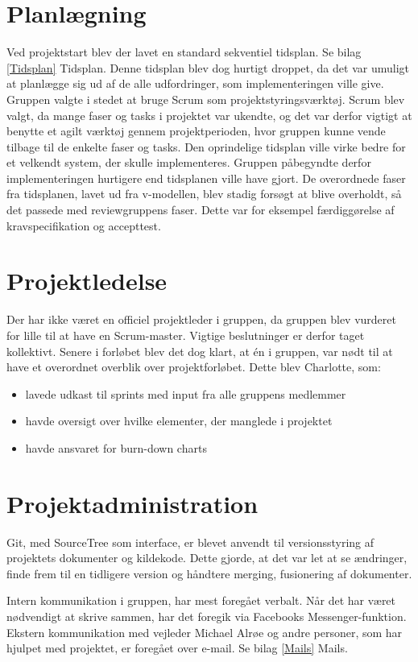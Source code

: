 \section{Planlægning}
Ved projektstart blev der lavet en standard sekventiel tidsplan. Se bilag \ref{Tidsplan} Tidsplan. Denne tidsplan blev dog hurtigt droppet, da det var umuligt at planlægge sig ud af de alle udfordringer, som implementeringen ville give. Gruppen valgte i stedet at bruge Scrum som projektstyringsværktøj. Scrum blev valgt, da mange faser og tasks i projektet var ukendte, og det var derfor vigtigt at benytte et agilt værktøj gennem projektperioden, hvor gruppen kunne vende tilbage til de enkelte faser og tasks. Den oprindelige tidsplan ville virke bedre for et velkendt system, der skulle implementeres. Gruppen påbegyndte derfor implementeringen hurtigere end tidsplanen ville have gjort. De overordnede faser fra tidsplanen, lavet ud fra v-modellen, blev stadig forsøgt at blive overholdt, så det passede med reviewgruppens faser. Dette var for eksempel færdiggørelse af kravspecifikation og accepttest. 

\section{Projektledelse}
Der har ikke været en officiel projektleder i gruppen, da gruppen blev vurderet for lille til at have en Scrum-master. Vigtige beslutninger er derfor taget kollektivt. Senere i forløbet blev det dog klart, at én i gruppen, var nødt til at have et overordnet overblik over projektforløbet. Dette blev Charlotte, som: 
\begin{itemize}
\item lavede udkast til sprints  med input fra alle gruppens medlemmer
\item havde oversigt over hvilke elementer, der manglede i projektet
\item havde ansvaret for burn-down charts
\end{itemize} 

\section{Projektadministration}
Git, med SourceTree som interface, er blevet anvendt til versionsstyring af projektets dokumenter og kildekode. Dette gjorde, at det var let at se ændringer, finde frem til en tidligere version og håndtere merging, fusionering af dokumenter.

Intern kommunikation i gruppen, har mest foregået verbalt. Når det har været nødvendigt at skrive sammen, har det foregik via Facebooks Messenger-funktion. Ekstern kommunikation med vejleder Michael Alrøe og andre personer, som har hjulpet med projektet, er foregået over e-mail. Se bilag \ref{Mails} Mails.  

